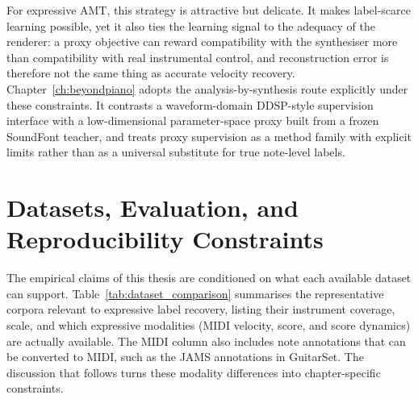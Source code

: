 For expressive AMT, this strategy is attractive but delicate. It makes label-scarce learning possible, yet it also ties the learning signal to the adequacy of the renderer: a proxy objective can reward compatibility with the synthesiser more than compatibility with real instrumental control, and reconstruction error is therefore not the same thing as accurate velocity recovery. Chapter~\ref{ch:beyondpiano} adopts the analysis-by-synthesis route explicitly under these constraints. It contrasts a waveform-domain DDSP-style supervision interface with a low-dimensional parameter-space proxy built from a frozen SoundFont teacher, and treats proxy supervision as a method family with explicit limits rather than as a universal substitute for true note-level labels.

\section{Datasets, Evaluation, and Reproducibility Constraints}
\label{sec:bg:dataeval}

The empirical claims of this thesis are conditioned on what each available dataset can support. Table~\ref{tab:dataset_comparison} summarises the representative corpora relevant to expressive label recovery, listing their instrument coverage, scale, and which expressive modalities (MIDI velocity, score, and score dynamics) are actually available. The MIDI column also includes note annotations that can be converted to MIDI, such as the JAMS annotations in GuitarSet. The discussion that follows turns these modality differences into chapter-specific constraints.


